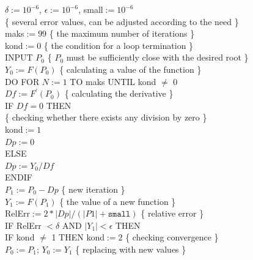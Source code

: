 \documentclass[12pt,a4paper]{report}
\begin{document}
{\ttfamily $\delta:= 10^{-6}$, \qquad $\epsilon:= 10^{-6}$, \qquad small$:= 10^{-6}$ \\
\{ several error values, can be adjusted according to the need \} \\
maks$:= 99$ \qquad \qquad \{ the maximum number of iterations \} \\
kond$:=  0$ \qquad \qquad \{ the condition for a loop termination \} \\
INPUT $P_0$ \qquad \qquad \{ $P_0$ must be sufficiently close with the desired root \} \\
$Y_0:=F(P_0)$ \qquad \qquad \{ calculating a value of the function \} \\
\newline
DO FOR $N:= 1$ TO maks UNTIL kond $\neq$ 0 \\
\hspace*{.2in} $Df:= F^{\prime}(P_0)$ \qquad \qquad \{ calculating the derivative \} \\
\hspace*{.5in} IF $Df = 0$ THEN \qquad \qquad 	\\	\{ checking whether there exists any division by zero \} \\
\hspace*{1in} kond$:= 1$ \\
\hspace*{1in} $Dp:= 0$ \\
\hspace*{.8in} ELSE \\
\hspace*{1in} $Dp:= Y_0/Df$ \\
\hspace*{.5in} ENDIF \\
\hspace*{.2in} $P_1:= P_0 - Dp$ \qquad \qquad \{ new iteration \} \\
\hspace*{.2in} $Y_1:= F(P_1)$   \qquad \qquad \{ the value of a new function \} \\
\hspace*{.2in} RelErr$:= 2\ast|Dp|/(|P1| + \texttt{small})$ \qquad \qquad \{ relative error \} \\
\hspace*{.2in} IF RelErr $< \delta$ AND $|Y_1| < \epsilon$ THEN \\
\hspace*{.5in} IF kond $\neq$ 1 THEN kond$:= 2$ \qquad \qquad \{ checking convergence \}  \\
\hspace*{.2in} $P_0:= P_1$; \qquad $Y_0:= Y_1$  \qquad \qquad \{ replacing with new values \} \\
}
\end{document}
